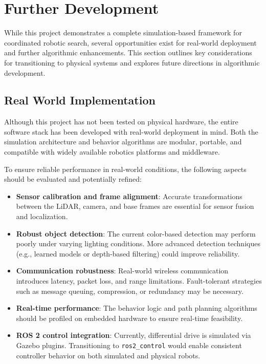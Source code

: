 \section{Further Development}
While this project demonstrates a complete simulation-based framework for coordinated robotic search, several opportunities exist for real-world deployment and further algorithmic enhancements. This section outlines key considerations for transitioning to physical systems and explores future directions in algorithmic development.

\subsection{Real World Implementation}
Although this project has not been tested on physical hardware, the entire software stack has been developed with real-world deployment in mind. Both the simulation architecture and behavior algorithms are modular, portable, and compatible with widely available robotics platforms and middleware.

To ensure reliable performance in real-world conditions, the following aspects should be evaluated and potentially refined:

\begin{itemize}
  \item \textbf{Sensor calibration and frame alignment}: Accurate transformations between the LiDAR, camera, and base frames are essential for sensor fusion and localization.
  \item \textbf{Robust object detection}: The current color-based detection may perform poorly under varying lighting conditions. More advanced detection techniques (e.g., learned models or depth-based filtering) could improve reliability.
  \item \textbf{Communication robustness}: Real-world wireless communication introduces latency, packet loss, and range limitations. Fault-tolerant strategies such as message queuing, compression, or redundancy may be necessary.
  \item \textbf{Real-time performance}: The behavior logic and path planning algorithms should be profiled on embedded hardware to ensure real-time feasibility.
  \item \textbf{ROS 2 control integration}: Currently, differential drive is simulated via Gazebo plugins. Transitioning to \texttt{ros2\_control} would enable consistent controller behavior on both simulated and physical robots.
\end{itemize}

